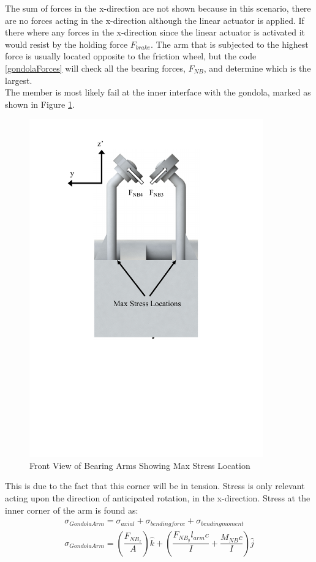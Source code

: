 \documentclass[../main.tex]{subfiles}
\begin{document}
The sum of forces in the x-direction are not shown because in this scenario, there are no forces acting in the x-direction although the linear actuator is applied. If there where any forces in the x-direction since the linear actuator is activated it would resist by the holding force $F_{brake}$. The arm that is subjected to the highest force is usually located opposite to the friction wheel, but the code \ref{gondolaForces} will check all the bearing forces, $F_{NB}$, and determine which is the largest. \\

The member is most likely fail at the inner interface with the gondola, marked as shown in Figure \ref{fig:armStressLocation}.
\begin{figure}[H]
	\centering
	\includegraphics[width=0.9\textwidth]{img/gondola/BearingArmStressLocation.pdf}
	\caption{Front View of Bearing Arms Showing Max Stress Location}
	\label{fig:armStressLocation}
\end{figure}
This is due to the fact that this corner will be in tension. Stress is only relevant acting upon the direction of anticipated rotation, in the x-direction. Stress at the inner corner of the arm is found as:
\begin{align}
	\sigma _{Gondola Arm} = \sigma _{axial} + \sigma _{bending force} + \sigma _{bending moment} \\ \label{armStress}
	\sigma _{Gondola Arm}  = \left(\dfrac{F_{NB_{z}}}{A}\right)\hat{k} + \left(\dfrac{F_{NB_{y}}l_{arm}c}{I}  + \dfrac{M_{NB}c}{I} \right) \hat{j}
\end{align}
\end{document}
